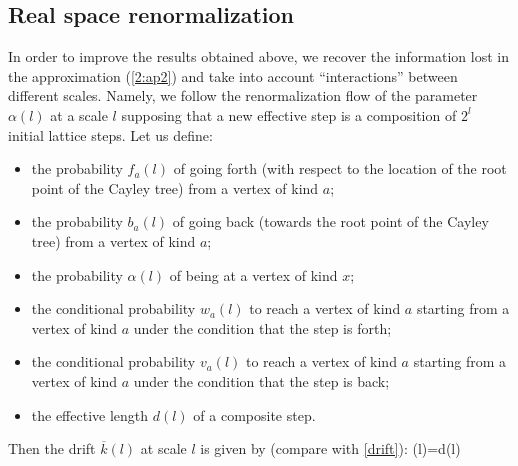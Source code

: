 \subsection{Real space renormalization}

In order to improve the results obtained above, we recover the information
lost in the approximation (\ref{2:ap2}) and take into account 
``interactions'' between different scales. Namely, we follow the renormalization
flow of the parameter $\alpha(l)$ at a scale $l$ supposing that a new effective
step is  a composition of $2^l$ initial lattice steps. Let us define:
\begin{itemize}
\item the probability $f_a(l)$ of going forth (with respect to the location of
the root point of the Cayley tree) from a vertex of kind $a$;
\item the probability $b_a(l)$ of going back (towards the root point of the
Cayley tree) from a vertex of kind $a$;
\item the probability $\alpha(l)$ of being at a vertex of kind $x$;
\item the conditional probability $w_a(l)$ to reach  a vertex of kind $a$ starting
from a vertex of kind $a$ under the condition that the step is forth;
\item the conditional probability $v_a(l)$ to reach  a vertex of kind $a$ starting
from a vertex of kind $a$ under the condition that the step is back;

\item the effective length $d(l)$ of a composite step.
\end{itemize}

Then the drift $\overline{k}(l)$ at scale $l$ is given by (compare with \ref{drift}):
\be\label{2:kl}
(l)=d(l)
\ee

